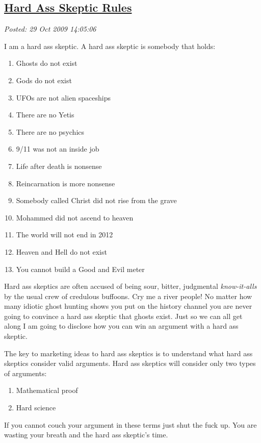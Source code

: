 %

\subsection*{\href{http://bakerjd99.wordpress.com/2009/10/29/hard-ass-skeptic-rules/}{Hard Ass Skeptic Rules}}


\noindent\emph{Posted: 29 Oct 2009 14:05:06}
\vspace{6pt}

I am a hard ass skeptic. A hard ass skeptic is somebody that holds:

\begin{enumerate}
\item
  Ghosts do not exist
\item
  Gods do not exist
\item
  UFOs are not alien spaceships
\item
  There are no Yetis
\item
  There are no psychics
\item
  9/11 was not an inside job
\item
  Life after death is nonsense
\item
  Reincarnation is more nonsense
\item
  Somebody called Christ did not rise from the grave
\item
  Mohammed did not ascend to heaven
\item
  The world will not end in 2012
\item
  Heaven and Hell do not exist
\item
  You cannot build a Good and Evil meter
\end{enumerate}
Hard ass skeptics are often accused of being sour, bitter, judgmental
\emph{know-it-alls} by the usual crew of credulous buffoons. Cry me a
river people! No matter how many idiotic ghost hunting shows you put on
the history channel you are never going to convince a hard ass skeptic
that ghosts exist. Just so we can all get along I am going to disclose
how you can win an argument with a hard ass skeptic.

The key to marketing ideas to hard ass skeptics is to understand what
hard ass skeptics consider valid arguments. Hard ass skeptics will
consider only two types of arguments:

\begin{enumerate}
\item
  Mathematical proof
\item
  Hard science
\end{enumerate}
If you cannot couch your argument in these terms just shut the fuck up.
You are wasting your breath and the hard ass skeptic's time.

